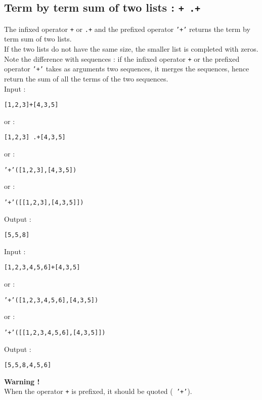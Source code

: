 \documentclass[a4paper,11pt]{book}
\begin{document}
\subsection{Term by term sum of two lists : {\tt +
.+}}
The infixed operator {\tt +} or {\tt .+} and the prefixed operator
 {\tt '+'} returns the term by term sum of two lists.\\
If the two lists do not have the same size, the smaller list is
completed with
zeros.\\
Note the difference with sequences : if the infixed operator {\tt +}
or the 
prefixed operator {\tt '+'} takes as arguments two sequences, it
merges the sequences, hence return the 
sum of all the terms of the two sequences.\\
Input :
\begin{center}{\tt [1,2,3]+[4,3,5]}\end{center}
or :
\begin{center}{\tt [1,2,3] .+[4,3,5]}\end{center}
or :
\begin{center}{\tt '+'([1,2,3],[4,3,5])}\end{center}
or :
\begin{center}{\tt '+'([[1,2,3],[4,3,5]])}\end{center}
Output :
\begin{center}{\tt [5,5,8]}\end{center}
Input :
\begin{center}{\tt [1,2,3,4,5,6]+[4,3,5]}\end{center}
or :
\begin{center}{\tt '+'([1,2,3,4,5,6],[4,3,5])}\end{center}
or :
\begin{center}{\tt '+'([[1,2,3,4,5,6],[4,3,5]])}\end{center}
Output :
\begin{center}{\tt [5,5,8,4,5,6]}\end{center}
{\bf Warning !}\\
When the operator {\tt +} is prefixed, it should be quoted ({\tt
'+'}).
\end{document}
